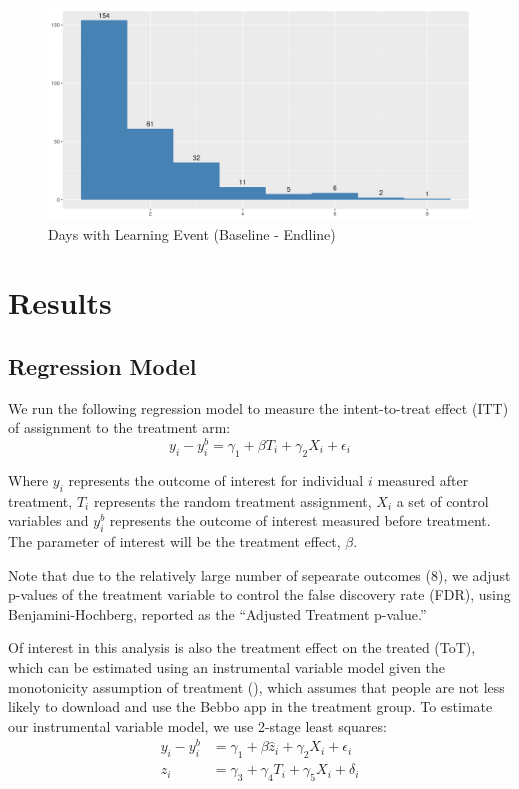 \documentclass{article}
\begin{document}
\begin{figure}[H]
  \centering  
\includegraphics[width=\textwidth]{plots/Treatment Takeup Baseline - Endline.png} 
\caption{Days with Learning Event (Baseline - Endline)} 
\label{fig:treatment-takeup-histogram}  
\end{figure}

 
      

      


\section{Results}

\subsection*{Regression Model}

We run the following regression model to measure the intent-to-treat effect (ITT) of assignment to the treatment arm:
$$
y_{i} - y^{b}_i = \gamma_1 + \beta T_{i} + \gamma_2X_{i} + \epsilon_i
$$

Where $y_i$ represents the outcome of interest for individual $i$ measured after treatment, $T_i$ represents the random treatment assignment, $X_i$ a set of control variables and $y^b_i$ represents the outcome of interest measured before treatment. The parameter of interest will be the treatment effect, $\beta$.

Note that due to the relatively large number of sepearate outcomes (8), we adjust p-values of the treatment variable to control the false discovery rate (FDR), using Benjamini-Hochberg, reported as the ``Adjusted Treatment p-value.''

Of interest in this analysis is also the treatment effect on the treated (ToT), which can be estimated using an instrumental variable model given the monotonicity assumption of treatment (\cite{Imbens2015}), which assumes that people are not less likely to download and use the Bebbo app in the treatment group. To estimate our instrumental variable model, we use 2-stage least squares:
\begin{align*}
y_{i} - y^{b}_i &= \gamma_1 + \beta \hat{z}_{i} + \gamma_2X_{i} + \epsilon_i \\
z_{i} &= \gamma_3 + \gamma_4 T_{i} + \gamma_5X_{i} + \delta_i
\end{align*}
\end{document}
